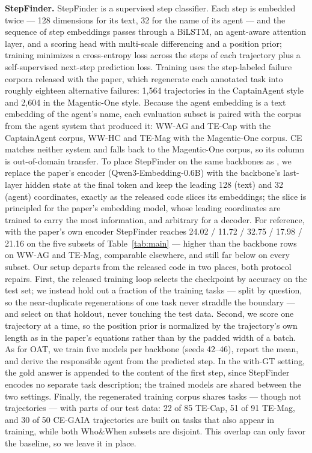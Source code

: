 \textbf{StepFinder.}
StepFinder is a supervised step classifier. Each step is embedded twice --- 128
dimensions for its text, 32 for the name of its agent --- and the sequence of
step embeddings passes through a BiLSTM, an agent-aware attention layer, and a
scoring head with multi-scale differencing and a position prior; training
minimizes a cross-entropy loss across the steps of each trajectory plus a
self-supervised next-step prediction loss. Training uses the step-labeled
failure corpora released with the paper, which regenerate each annotated task
into roughly eighteen alternative failures: 1{,}564 trajectories in the
CaptainAgent style and 2{,}604 in the Magentic-One style. Because the agent
embedding is a text embedding of the agent's name, each evaluation subset is
paired with the corpus from the agent system that produced it: WW-AG and TE-Cap
with the CaptainAgent corpus, WW-HC and TE-Mag with the Magentic-One corpus. CE
matches neither system and falls back to the Magentic-One corpus, so its column
is out-of-domain transfer. To place StepFinder on the same backbones as \soap,
we replace the paper's encoder (Qwen3-Embedding-0.6B) with the backbone's
last-layer hidden state at the final token and keep the leading 128 (text) and
32 (agent) coordinates, exactly as the released code slices its embeddings; the
slice is principled for the paper's embedding model, whose leading coordinates
are trained to carry the most information, and arbitrary for a decoder. For
reference, with the paper's own encoder StepFinder reaches 24.02 / 11.72 /
32.75 / 17.98 / 21.16 on the five subsets of Table~\ref{tab:main} --- higher
than the backbone rows on WW-AG and TE-Mag, comparable elsewhere, and still far
below \soap{} on every subset. Our setup departs
from the released code in two places, both protocol repairs. First, the
released training loop selects the checkpoint by accuracy on the test set; we
instead hold out a fraction of the training tasks --- split by question, so the
near-duplicate regenerations of one task never straddle the boundary --- and
select on that holdout, never touching the test data. Second, we score one
trajectory at a time, so the position prior is normalized by the trajectory's
own length as in the paper's equations rather than by the padded width of a
batch. As for OAT, we train five models per backbone (seeds 42--46), report the
mean, and derive the responsible agent from the predicted step. In the with-GT
setting, the gold answer is appended to the content of the first step, since
StepFinder encodes no separate task description; the trained models are shared
between the two settings. Finally, the regenerated training corpus shares tasks
--- though not trajectories --- with parts of our test data: 22 of 85 TE-Cap,
51 of 91 TE-Mag, and 30 of 50 CE-GAIA trajectories are built on tasks that also
appear in training, while both Who\&When subsets are disjoint. This overlap can
only favor the baseline, so we leave it in place.

